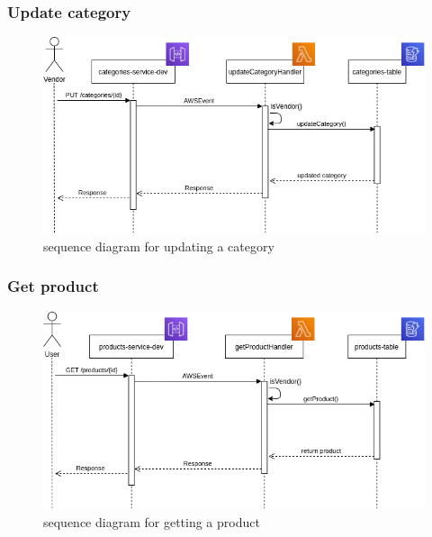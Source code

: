 \subsubsection{Update category}
\begin{figure}[!h]
    \vspace{5px}
    \includegraphics[scale=0.5]{../../../../Images/Diagrammi/maintainerManual/updateCategorySequence.png}
    \centering
    \caption{sequence diagram for updating a category} 
\end{figure}
\pagebreak
\subsubsection{Get product}
\begin{figure}[!h]
    \vspace{5px}
    \includegraphics[scale=0.5]{../../../../Images/Diagrammi/maintainerManual/getProductSequence.png}
    \centering
    \caption{sequence diagram for getting a product} 
\end{figure}